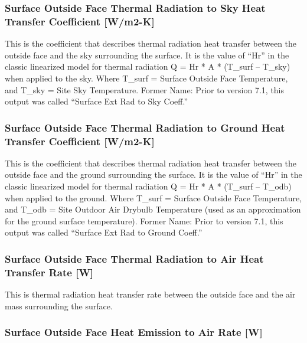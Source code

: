\subsubsection{Surface Outside Face Thermal Radiation to Sky Heat Transfer Coefficient {[}W/m2-K{]}}\label{surface-outside-face-thermal-radiation-to-sky-heat-transfer-coefficient-wm2-k}

This is the coefficient that describes thermal radiation heat transfer between the outside face and the sky surrounding the surface. It is the value of ``Hr'' in the classic linearized model for thermal radiation Q = Hr * A * (T\_surf -- T\_sky) when applied to the sky. Where T\_surf = Surface Outside Face Temperature, and T\_sky = Site Sky Temperature. Former Name: Prior to version 7.1, this output was called ``Surface Ext Rad to Sky Coeff.''

\subsubsection{Surface Outside Face Thermal Radiation to Ground Heat Transfer Coefficient {[}W/m2-K{]}}\label{surface-outside-face-thermal-radiation-to-ground-heat-transfer-coefficient-wm2-k}

This is the coefficient that describes thermal radiation heat transfer between the outside face and the ground surrounding the surface. It is the value of ``Hr'' in the classic linearized model for thermal radiation Q = Hr * A * (T\_surf -- T\_odb) when applied to the ground. Where T\_surf = Surface Outside Face Temperature, and T\_odb = Site Outdoor Air Drybulb Temperature (used as an approximation for the ground surface temperature). Former Name: Prior to version 7.1, this output was called ``Surface Ext Rad to Ground Coeff.''

\subsubsection{Surface Outside Face Thermal Radiation to Air Heat Transfer Rate {[}W{]}}\label{surface-outside-face-thermal-radiation-to-air-heat-transfer-rate-w}

This is thermal radiation heat transfer rate between the outside face and the air mass surrounding the surface.

\subsubsection{Surface Outside Face Heat Emission to Air Rate {[}W{]}}\label{surface-outside-face-heat-emission-to-air-heat-transfer-rate-w}

